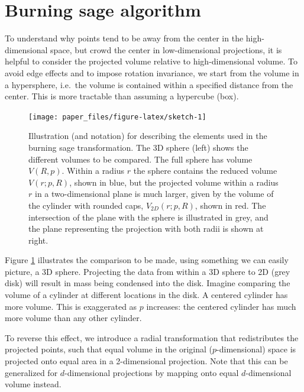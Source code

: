 \documentclass[]{interact}
\theoremstyle{plain}%
\theoremstyle{definition}
\theoremstyle{remark}
\begin{document}
\hypertarget{sec:method}{%
\section{Burning sage algorithm}\label{sec:method}}

To understand why points tend to be away from the center in the
high-dimensional space, but crowd the center in low-dimensional
projections, it is helpful to consider the projected volume relative to
high-dimensional volume. To avoid edge effects and to impose rotation
invariance, we start from the volume in a hypersphere, i.e.~the volume
is contained within a specified distance from the center. This is more
tractable than assuming a hypercube (box).

\begin{figure}

{\centering \texttt{[image: paper\_files/figure-latex/sketch-1]} 

}

\caption{Illustration (and notation) for describing the elements used in the burning sage transformation. The 3D sphere (left) shows the different volumes to be compared. The full sphere has volume $V(R, p)$. Within a radius $r$ the sphere contains the reduced volume $V(r; p, R)$, shown in blue, but the projected volume within a radius $r$ in a two-dimensional plane is much larger, given by the volume of the cylinder with rounded caps, $V_{2D}(r; p ,R)$, shown in red. The intersection of the plane with the sphere is illustrated in grey, and the plane representing the projection with both radii is shown at right.}\label{fig:sketch}
\end{figure}

Figure \ref{fig:sketch} illustrates the comparison to be made, using
something we can easily picture, a 3D sphere. Projecting the data from
within a 3D sphere to 2D (grey disk) will result in mass being condensed
into the disk. Imagine comparing the volume of a cylinder at different
locations in the disk. A centered cylinder has more volume. This is
exaggerated as \(p\) increases: the centered cylinder has much more
volume than any other cylinder.

To reverse this effect, we introduce a radial transformation that
redistributes the projected points, such that equal volume in the
original (\(p\)-dimensional) space is projected onto equal area in a
2-dimensional projection. Note that this can be generalized for
\(d\)-dimensional projections by mapping onto equal \(d\)-dimensional
volume instead.
\end{document}
